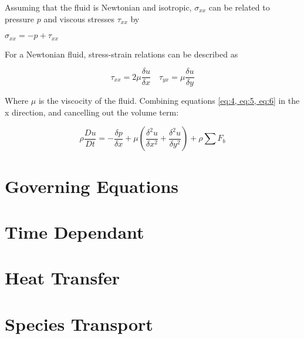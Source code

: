     Assuming that the fluid is Newtonian and isotropic, $\sigma_{xx}$ can be related to pressure $p$ and viscous stresses $\tau_{xx}$ by

    \centerline{$\sigma_{xx} = -p + \tau_{xx}$}

    For a Newtonian fluid, stress-strain relations can be described as 

    \begin{equation} \label{eq:6}
      \tau_{xx} = 2 \mu \frac{\delta u}{\delta x} \quad \tau_{yx} = \mu \frac{\delta u}{\delta y}
    \end{equation}

    Where $\mu$ is the viscocity of the fluid. Combining equations \ref{eq:4, eq:5, eq:6} in the x direction, and cancelling out the volume term:

    \begin{equation} \label{eq:7}
      \rho \frac{Du}{Dt} = - \frac{\delta p}{\delta x} + \mu (\frac{\delta^2 u}{\delta x^2} + \frac{\delta^2 u}{\delta y^2}) + \rho \sum F_{b}
    \end{equation}






\section{Governing Equations}

\section{Time Dependant}

\section{Heat Transfer}

\section{Species Transport}
